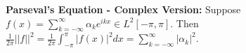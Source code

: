 {\bf Parseval's Equation - Complex Version: } Suppose $f(x)=\sum_{k=-\infty}^{\infty} \alpha_ke^{ikx}\in L^2[-\pi,\pi]$. Then \newline $\frac{1}{2\pi}||f||^2=\frac{1}{2\pi}\int_{-\pi}^{\pi}|f(x)|^2dx=\sum_{k=-\infty}^{\infty}|\alpha_k|^2$.